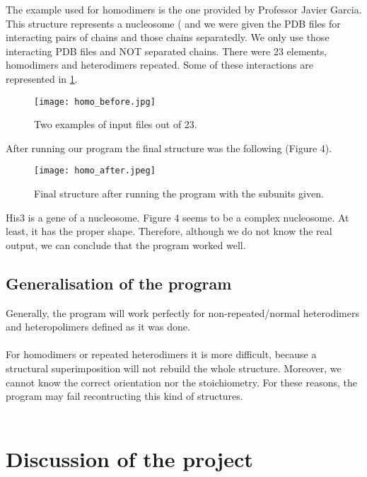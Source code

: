 \documentclass[a4paper,12pt]{report}
\begin{document}
The example used for homodimers is the one provided by Professor Javier Garcia. This structure represents a nucleosome ( and we were given the PDB files for interacting pairs of chains and those chains separatedly. We only use those interacting PDB files and NOT separated chains. There were 23 elements, homodimers and heterodimers repeated. Some of these interactions are represented in \ref{fig:3}.\\

\begin{figure}[h]
\texttt{[image: homo\_before.jpg]}
\centering
\caption{Two examples of input files out of 23.}
\label{fig:3}
\end{figure}

\noindent
After running our program the final structure was the following (Figure 4).\\

\begin{figure}[h]
\centering
\texttt{[image: homo\_after.jpeg]}
\caption{Final structure after running the program with the subunits given.}
\label{fig:4}
\end{figure}

\noindent
His3 is a gene of a nucleosome. Figure 4 seems to be a complex nucleosome. At least, it has the proper shape. Therefore, although we do not know the real output, we can conclude that the program worked well.\\



\section{Generalisation of the program}

Generally, the program will work perfectly for non-repeated/normal heterodimers and heteropolimers defined as it was done.\\\\
For homodimers or repeated heterodimers it is more difficult, because a structural superimposition will not rebuild the whole structure. Moreover, we cannot know the correct orientation nor the stoichiometry. For these reasons, the program may fail recontructing this kind of structures.\\\\



\chapter{Discussion of the project}
\end{document}
